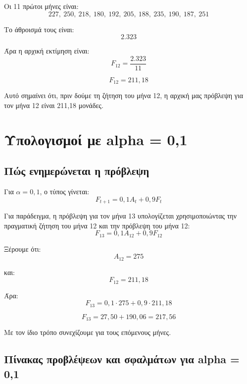 \documentclass[12pt,a4paper]{article}
\begin{document}
Οι 11 πρώτοι μήνες είναι:
\[
227,\ 250,\ 218,\ 180,\ 192,\ 205,\ 188,\ 235,\ 190,\ 187,\ 251
\]

Το άθροισμά τους είναι:
\[
2.323
\]

Άρα η αρχική εκτίμηση είναι:
\[
F_{12}=\frac{2.323}{11}
\]

\[
F_{12}=211{,}18
\]

Αυτό σημαίνει ότι, πριν δούμε τη ζήτηση του μήνα 12, η αρχική μας πρόβλεψη για τον μήνα 12 είναι 211,18 μονάδες.

\section{Υπολογισμοί με alpha = 0,1}

\subsection{Πώς ενημερώνεται η πρόβλεψη}

Για \(\alpha=0{,}1\), ο τύπος γίνεται:
\[
F_{t+1}=0{,}1A_t+0{,}9F_t
\]

Για παράδειγμα, η πρόβλεψη για τον μήνα 13 υπολογίζεται χρησιμοποιώντας την πραγματική ζήτηση του μήνα 12 και την πρόβλεψη του μήνα 12:
\[
F_{13}=0{,}1A_{12}+0{,}9F_{12}
\]

Ξέρουμε ότι:
\[
A_{12}=275
\]

και:
\[
F_{12}=211{,}18
\]

Άρα:
\[
F_{13}=0{,}1\cdot275+0{,}9\cdot211{,}18
\]

\[
F_{13}=27{,}50+190{,}06=217{,}56
\]

Με τον ίδιο τρόπο συνεχίζουμε για τους επόμενους μήνες.

\subsection{Πίνακας προβλέψεων και σφαλμάτων για alpha = 0,1}
\end{document}
